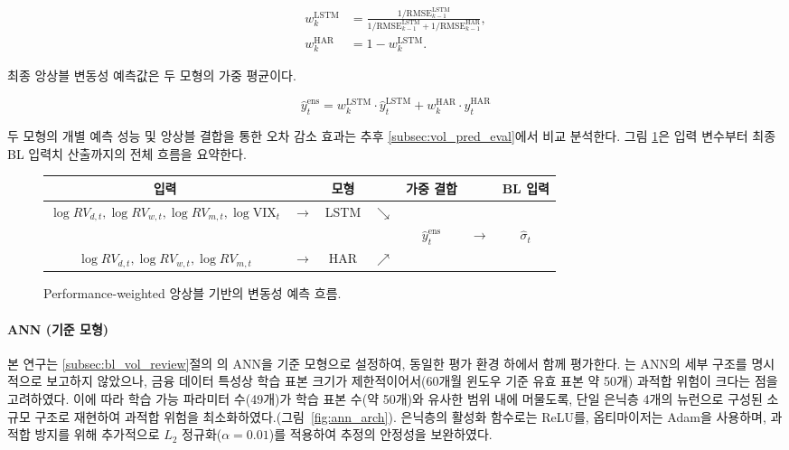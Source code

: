 \documentclass{article}
\begin{document}
\begin{align}
w_k^{\text{LSTM}} &= \frac{1/\text{RMSE}_{k-1}^{\text{LSTM}}}
{1/\text{RMSE}_{k-1}^{\text{LSTM}} + 1/\text{RMSE}_{k-1}^{\text{HAR}}},
\label{eq:ens_weight_lstm}\\
w_k^{\text{HAR}} &= 1 - w_k^{\text{LSTM}}.
\label{eq:ens_weight_har}
\end{align}

최종 앙상블 변동성 예측값은 두 모형의 가중 평균이다.

\begin{equation}
\hat{y}^{\text{ens}}_t = w_k^{\text{LSTM}} \cdot \hat{y}^{\text{LSTM}}_t
+ w_k^{\text{HAR}} \cdot \hat{y}^{\text{HAR}}_t
\label{eq:ens_pred}
\end{equation}

두 모형의 개별 예측 성능 및 앙상블 결합을 통한 오차 감소 효과는 추후 \ref{subsec:vol_pred_eval}에서 비교 분석한다. 그림 \ref{fig:ensemble_flow}은 입력 변수부터 최종 BL 입력치 산출까지의 전체 흐름을 요약한다.

\begin{figure}[ht]
\centering
\renewcommand{\arraystretch}{1.4}
\begin{tabular}{c c c c c c c}
\textbf{입력} & & \textbf{모형} & & \textbf{가중 결합} & & \textbf{BL 입력} \\
\hline
$\log RV_{d,t}, \log RV_{w,t}, \log RV_{m,t}, \log \text{VIX}_{t}$ & $\longrightarrow$ & LSTM & $\searrow$ & & & \\
& & & & $\hat{y}^{\text{ens}}_t$& $\longrightarrow$ & $\hat{\sigma}_t$\\
$\log RV_{d,t}, \log RV_{w,t}, \log RV_{m,t}$ & $\longrightarrow$ & HAR & $\nearrow$ & & & \\
\end{tabular}
\caption{Performance-weighted 앙상블 기반의 변동성 예측 흐름.}
\label{fig:ensemble_flow}
\end{figure}

\paragraph{ANN (기준 모형)}
본 연구는 \ref{subsec:bl_vol_review}절의 \citet{pyo2018}의 ANN을 기준 모형으로 설정하여, 동일한 평가 환경 하에서 함께 평가한다. \citet{pyo2018}는 ANN의 세부 구조를 명시적으로 보고하지 않았으나, 금융 데이터 특성상 학습 표본 크기가 제한적이어서(60개월 윈도우 기준 유효 표본 약 50개) 과적합 위험이 크다는 점을 고려하였다. 이에 따라 학습 가능 파라미터 수(49개)가 학습 표본 수(약 50개)와 유사한 범위 내에 머물도록, 단일 은닉층 4개의 뉴런으로 구성된 소규모 구조로 재현하여 과적합 위험을 최소화하였다.(그림~\ref{fig:ann_arch}). 은닉층의 활성화 함수로는 ReLU를, 옵티마이저는 Adam을 사용하며, 과적합 방지를 위해 추가적으로 $L_2$ 정규화($\alpha = 0.01$)를 적용하여 추정의 안정성을 보완하였다.
\end{document}
